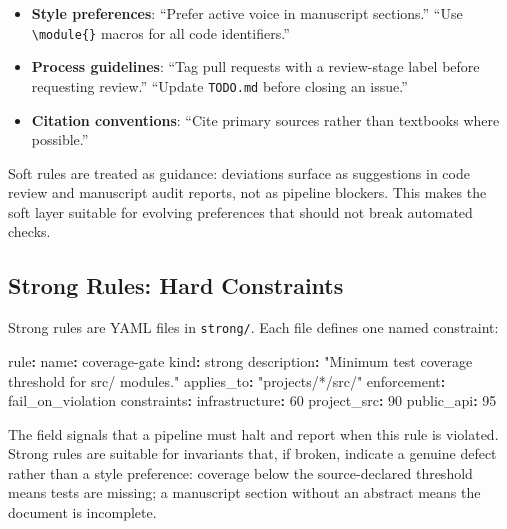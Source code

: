 \documentclass[
]{article}
\newenvironment{Shaded}{}{}
\newcommand{\AttributeTok}[1]{\textcolor[rgb]{0.49,0.56,0.16}{#1}}
\newcommand{\DecValTok}[1]{\textcolor[rgb]{0.25,0.63,0.44}{#1}}
\newcommand{\FunctionTok}[1]{\textcolor[rgb]{0.02,0.16,0.49}{#1}}
\newcommand{\KeywordTok}[1]{\textcolor[rgb]{0.00,0.44,0.13}{\textbf{#1}}}
\newcommand{\StringTok}[1]{\textcolor[rgb]{0.25,0.44,0.63}{#1}}
\providecommand{\tightlist}{%
  \setlength{\itemsep}{0pt}\setlength{\parskip}{0pt}}
\begin{document}
\begin{itemize}
\tightlist
\item
  \textbf{Style preferences}: ``Prefer active voice in manuscript
  sections.'' ``Use \texttt{\textbackslash{}module\{\}} macros for all
  code identifiers.''
\item
  \textbf{Process guidelines}: ``Tag pull requests with a review-stage
  label before requesting review.'' ``Update \texttt{TODO.md} before
  closing an issue.''
\item
  \textbf{Citation conventions}: ``Cite primary sources rather than
  textbooks where possible.''
\end{itemize}

Soft rules are treated as guidance: deviations surface as suggestions in
code review and manuscript audit reports, not as pipeline blockers. This
makes the soft layer suitable for evolving preferences that should not
break automated checks.

\subsection{Strong Rules: Hard
Constraints}\label{strong-rules-hard-constraints}

Strong rules are YAML files in \texttt{strong/}. Each file defines one
named constraint:

\begin{Shaded}
\begin{Highlighting}[]
\FunctionTok{rule}\KeywordTok{:}
\AttributeTok{  }\FunctionTok{name}\KeywordTok{:}\AttributeTok{ coverage{-}gate}
\AttributeTok{  }\FunctionTok{kind}\KeywordTok{:}\AttributeTok{ strong}
\AttributeTok{  }\FunctionTok{description}\KeywordTok{:}\AttributeTok{ }\StringTok{"Minimum test coverage threshold for src/ modules."}
\AttributeTok{  }\FunctionTok{applies\_to}\KeywordTok{:}\AttributeTok{ }\StringTok{"projects/*/src/"}
\AttributeTok{  }\FunctionTok{enforcement}\KeywordTok{:}\AttributeTok{ fail\_on\_violation}
\AttributeTok{  }\FunctionTok{constraints}\KeywordTok{:}
\AttributeTok{    }\FunctionTok{infrastructure}\KeywordTok{:}\AttributeTok{ }\DecValTok{60}
\AttributeTok{    }\FunctionTok{project\_src}\KeywordTok{:}\AttributeTok{ }\DecValTok{90}
\AttributeTok{    }\FunctionTok{public\_api}\KeywordTok{:}\AttributeTok{ }\DecValTok{95}
\end{Highlighting}
\end{Shaded}

The  field signals that a
pipeline must halt and report when this rule is violated. Strong rules
are suitable for invariants that, if broken, indicate a genuine defect
rather than a style preference: coverage below the source-declared
threshold means tests are missing; a manuscript section without an
abstract means the document is incomplete.
\end{document}
